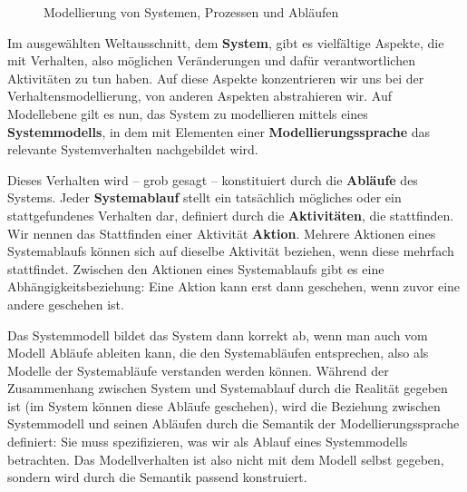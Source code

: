 \begin{figure}[!htbp]
{}
	\caption{Modellierung von Systemen, Prozessen und Abläufen}
	\label{fig:v3-system_prozess}
\end{figure}



Im ausgewählten Weltausschnitt, dem \textbf{System}, 
gibt es vielfältige Aspekte, die mit Verhalten, also möglichen Veränderungen und dafür verantwortlichen Aktivitäten zu tun haben. Auf diese Aspekte konzentrieren wir uns bei der Verhaltensmodellierung, von anderen Aspekten abstrahieren wir. Auf Modellebene gilt es nun, das System zu modellieren mittels eines \textbf{Systemmodells}, in dem mit Elementen einer \textbf{Modellierungssprache} das relevante Systemverhalten nachgebildet wird.

Dieses Verhalten wird -- grob gesagt -- konstituiert durch die \textbf{Abläufe} des Systems. 
Jeder \textbf{Systemablauf} stellt ein tatsächlich mögliches oder ein stattgefundenes Verhalten dar, definiert durch die \textbf{Aktivitäten}, die stattfinden. Wir nennen das Stattfinden einer Aktivität \textbf{Aktion}. Mehrere Aktionen eines Systemablaufs können sich auf dieselbe Aktivität beziehen, wenn diese mehrfach stattfindet. Zwischen den Aktionen eines Systemablaufs gibt es eine Abhängigkeitsbeziehung: Eine Aktion kann erst dann geschehen, wenn zuvor eine andere geschehen ist.

Das Systemmodell bildet das System dann korrekt ab, 
wenn man auch vom Modell Abläufe ableiten kann, die den Systemabläufen entsprechen, also als Modelle der Systemabläufe verstanden werden können. Während der Zusammenhang zwischen System und Systemablauf durch die Realität gegeben ist (im System können diese Abläufe geschehen), wird die Beziehung zwischen Systemmodell und seinen Abläufen durch die Semantik der Modellierungssprache definiert: Sie muss spezifizieren, was wir als Ablauf eines Systemmodells betrachten. Das Modellverhalten ist also nicht mit dem Modell selbst gegeben, sondern wird durch die Semantik passend konstruiert.

